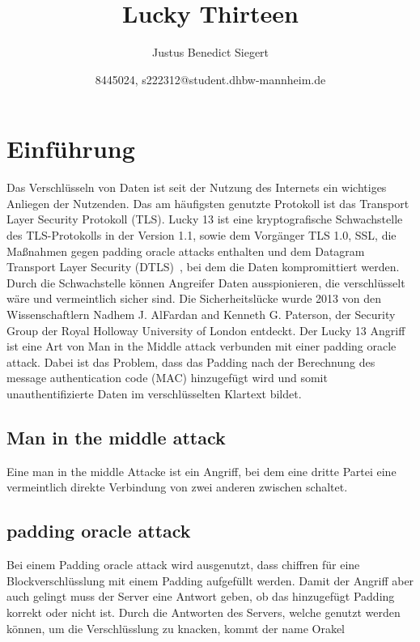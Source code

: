 \documentclass[a4paper,11pt]{scrartcl}
\begin{document}
    \title{Lucky Thirteen}
    \author{Justus Benedict Siegert}
    \date{8445024, s222312@student.dhbw-mannheim.de}
    \maketitle
    \tableofcontents
    \newpage


    \section{Einführung}\label{sec:einfuhrung}
    Das Verschlüsseln von Daten ist seit der Nutzung des Internets ein wichtiges Anliegen der Nutzenden.
    Das am häufigsten genutzte Protokoll ist das Transport Layer Security Protokoll (TLS).
    Lucky 13 ist eine kryptografische Schwachstelle des TLS-Protokolls in der Version 1.1, sowie dem Vorgänger TLS 1.0, SSL, die Maßnahmen gegen padding oracle attacks enthalten und dem Datagram Transport Layer Security (DTLS)~\cite[S.2]{AlFardan2013},
    bei dem die Daten kompromittiert werden.
    Durch die Schwachstelle können Angreifer Daten ausspionieren, die verschlüsselt wäre und vermeintlich sicher sind.
    Die Sicherheitslücke wurde 2013 von den Wissenschaftlern Nadhem J. AlFardan and Kenneth G. Paterson, der Security Group der Royal Holloway University of London entdeckt.
    \newline
    Der Lucky 13 Angriff ist eine Art von Man in the Middle attack verbunden mit einer padding oracle attack.
    Dabei ist das Problem, dass das Padding nach der Berechnung des message authentication code (MAC) hinzugefügt wird und somit unauthentifizierte Daten im verschlüsselten Klartext bildet.

    \subsection{Man in the middle attack}\label{subsec:man-in-the-middle-attack}
    Eine man in the middle Attacke ist ein Angriff, bei dem eine dritte Partei eine vermeintlich direkte Verbindung von zwei anderen zwischen schaltet.

    \subsection{padding oracle attack}\label{subsec:padding-oracle-attack}
    Bei einem Padding oracle attack wird ausgenutzt, dass chiffren für eine Blockverschlüsslung mit einem Padding aufgefüllt werden.
    Damit der Angriff aber auch gelingt muss der Server eine Antwort geben, ob das hinzugefügt Padding korrekt oder nicht ist.
    Durch die Antworten des Servers, welche genutzt werden können, um die Verschlüsslung zu knacken, kommt der name Orakel
\end{document}
